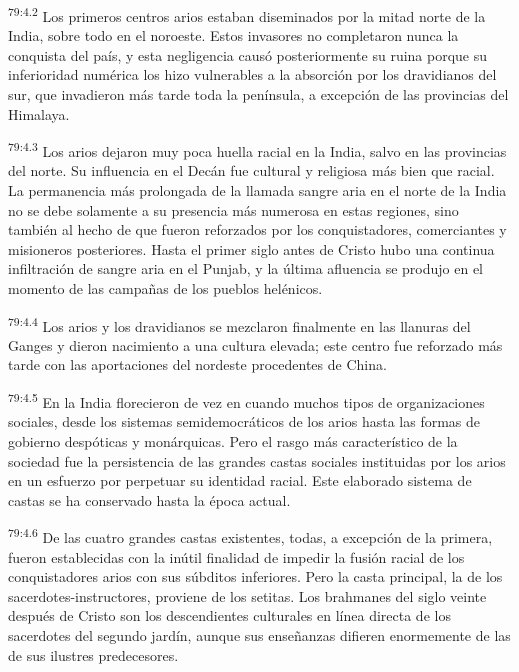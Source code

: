 \par
\textsuperscript{79:4.2} Los primeros centros arios estaban diseminados por la mitad norte de la India, sobre todo en el noroeste. Estos invasores no completaron nunca la conquista del país, y esta negligencia causó posteriormente su ruina porque su inferioridad numérica los hizo vulnerables a la absorción por los dravidianos del sur, que invadieron más tarde toda la península, a excepción de las provincias del Himalaya.

\par
\textsuperscript{79:4.3} Los arios dejaron muy poca huella racial en la India, salvo en las provincias del norte. Su influencia en el Decán fue cultural y religiosa más bien que racial. La permanencia más prolongada de la llamada sangre aria en el norte de la India no se debe solamente a su presencia más numerosa en estas regiones, sino también al hecho de que fueron reforzados por los conquistadores, comerciantes y misioneros posteriores. Hasta el primer siglo antes de Cristo hubo una continua infiltración de sangre aria en el Punjab, y la última afluencia se produjo en el momento de las campañas de los pueblos helénicos.

\par
\textsuperscript{79:4.4} Los arios y los dravidianos se mezclaron finalmente en las llanuras del Ganges y dieron nacimiento a una cultura elevada; este centro fue reforzado más tarde con las aportaciones del nordeste procedentes de China.

\par
\textsuperscript{79:4.5} En la India florecieron de vez en cuando muchos tipos de organizaciones sociales, desde los sistemas semidemocráticos de los arios hasta las formas de gobierno despóticas y monárquicas. Pero el rasgo más característico de la sociedad fue la persistencia de las grandes castas sociales instituidas por los arios en un esfuerzo por perpetuar su identidad racial. Este elaborado sistema de castas se ha conservado hasta la época actual.

\par
\textsuperscript{79:4.6} De las cuatro grandes castas existentes, todas, a excepción de la primera, fueron establecidas con la inútil finalidad de impedir la fusión racial de los conquistadores arios con sus súbditos inferiores. Pero la casta principal, la de los sacerdotes-instructores, proviene de los setitas. Los brahmanes del siglo veinte después de Cristo son los descendientes culturales en línea directa de los sacerdotes del segundo jardín, aunque sus enseñanzas difieren enormemente de las de sus ilustres predecesores.

